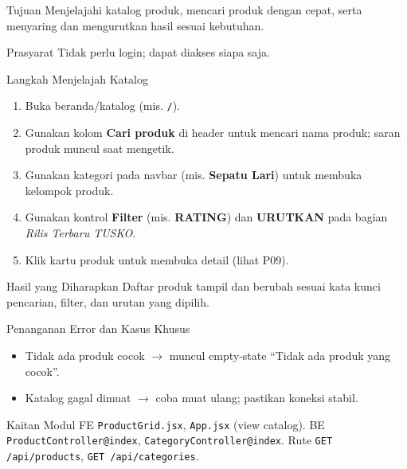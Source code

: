 
\begin{flowsection}{Tujuan}
Menjelajahi katalog produk, mencari produk dengan cepat, serta menyaring dan
mengurutkan hasil sesuai kebutuhan.
\end{flowsection}

\begin{flowsection}{Prasyarat}
Tidak perlu login; dapat diakses siapa saja.
\end{flowsection}

\begin{flowsection}{Langkah Menjelajah Katalog}
\begin{enumerate}
  \item Buka beranda/katalog (mis. \texttt{/}).
  \item Gunakan kolom \textbf{Cari produk} di header untuk mencari nama produk;
        saran produk muncul saat mengetik.
  \item Gunakan kategori pada navbar (mis. \textbf{Sepatu Lari}) untuk membuka
        kelompok produk.
  \item Gunakan kontrol \textbf{Filter} (mis. \textbf{RATING}) dan \textbf{URUTKAN}
        pada bagian \emph{Rilis Terbaru TUSKO}.
  \item Klik kartu produk untuk membuka detail (lihat P09).
\end{enumerate}
\end{flowsection}


\begin{flowsection}{Hasil yang Diharapkan}
Daftar produk tampil dan berubah sesuai kata kunci pencarian, filter, dan urutan
yang dipilih.
\end{flowsection}



\begin{flowsection}{Penanganan Error dan Kasus Khusus}
\begin{itemize}
  \item Tidak ada produk cocok $\rightarrow$ muncul empty-state ``Tidak ada produk yang cocok''.
  \item Katalog gagal dimuat $\rightarrow$ coba muat ulang; pastikan koneksi stabil.
\end{itemize}
\end{flowsection}

\begin{flowsection}{Kaitan Modul}
FE \texttt{ProductGrid.jsx}, \texttt{App.jsx} (view catalog). BE
\texttt{ProductController@index}, \texttt{CategoryController@index}. Rute
\texttt{GET /api/products}, \texttt{GET /api/categories}.
\end{flowsection}

